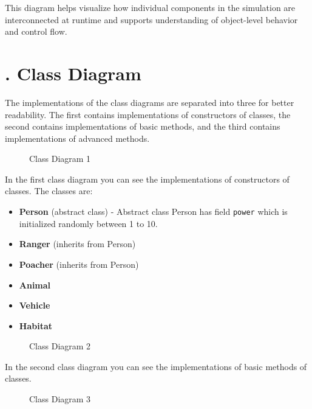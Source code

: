 \documentclass[a4paper,12pt]{article}
\begin{document}
\vspace{0.5em}

\noindent
This diagram helps visualize how individual components in the simulation are interconnected at runtime and supports understanding of object-level behavior and control flow.

\newpage

\section*{. Class Diagram}

The implementations of the class diagrams are separated into three for better readability. The first contains implementations of constructors of classes, the second contains implementations of basic methods, and the third contains implementations of advanced methods.

\vspace{0.5em}

\begin{figure}[H]
    \centering
    \caption{Class Diagram 1}
    \label{fig:class-diagram-1}
\end{figure}

In the first class diagram you can see the implementations of constructors of classes. The classes are:
\begin{itemize}
    \item \textbf{Person} (abstract class) - 
    \noindent Abstract class Person has field \texttt{power} which is initialized randomly between 1 to 10.
    \item \textbf{Ranger} (inherits from Person)
    \item \textbf{Poacher} (inherits from Person)
    \item \textbf{Animal}
    \item \textbf{Vehicle}
    \item \textbf{Habitat}
\end{itemize}

\begin{figure}[H]
    \centering
    \caption{Class Diagram 2}
    \label{fig:class-diagram-2}
\end{figure}

In the second class diagram you can see the implementations of basic methods of classes.

\begin{figure}[H]
    \centering
    \caption{Class Diagram 3}
    \label{fig:class-diagram-3}
\end{figure}
\end{document}

